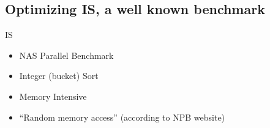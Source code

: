 \documentclass[xcolor={usenames,dvipsnames},hyperref={pdfusetitle}]{beamer}
\begin{document}
\subsection{Optimizing IS, a well known benchmark}

\begin{frame}{IS}
    \begin{block}{}
        \begin{itemize}
            \item NAS Parallel Benchmark~\cite{Jin99NPBOpenMP}
            \item Integer (bucket) Sort
            \item Memory Intensive
            \item<alert@1-> “Random memory access” (according to NPB website)
        \end{itemize}
    \end{block}
\end{frame}
\end{document}
